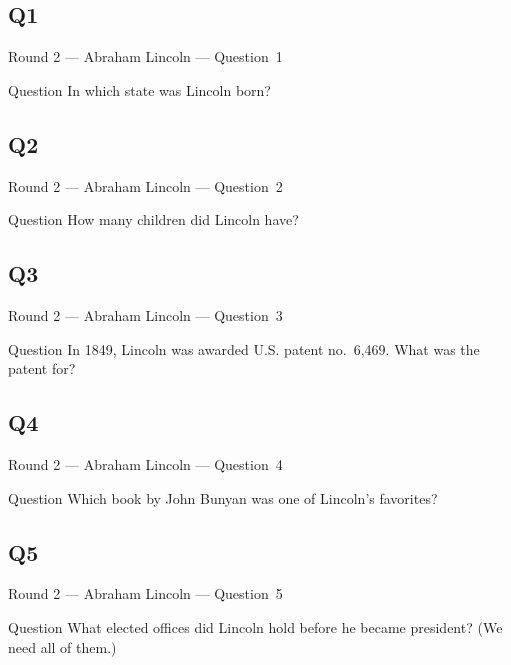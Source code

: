 \documentclass[11pt]{beamer}
\begin{document}
\subsection*{Q1}
\begin{frame}[t]{Round 2 --- Abraham Lincoln --- \mbox{Question 1}}
\vspace{-0.5em}
\begin{block}{Question}
In which state was Lincoln born?
\end{block}
\end{frame}
\subsection*{Q2}
\begin{frame}[t]{Round 2 --- Abraham Lincoln --- \mbox{Question 2}}
\vspace{-0.5em}
\begin{block}{Question}
How many children did Lincoln have?
\end{block}
\end{frame}
\subsection*{Q3}
\begin{frame}[t]{Round 2 --- Abraham Lincoln --- \mbox{Question 3}}
\vspace{-0.5em}
\begin{block}{Question}
In 1849, Lincoln was awarded U.S. patent no.\ 6,469.  What was the patent for?
\end{block}
\end{frame}
\subsection*{Q4}
\begin{frame}[t]{Round 2 --- Abraham Lincoln --- \mbox{Question 4}}
\vspace{-0.5em}
\begin{block}{Question}
Which book by John Bunyan was one of Lincoln's favorites?
\end{block}
\end{frame}
\subsection*{Q5}
\begin{frame}[t]{Round 2 --- Abraham Lincoln --- \mbox{Question 5}}
\vspace{-0.5em}
\begin{block}{Question}
What elected offices did Lincoln hold before he became president? (We need all of them.)
\end{block}
\end{frame}
\end{document}
